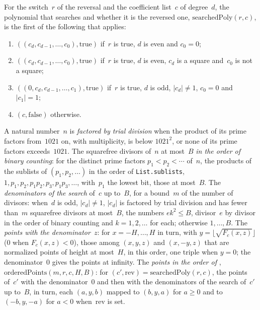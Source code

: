\begin{definition}\label{def:orderedPoints}
  \leanok
  For the switch~$r$ of the reversal and the coefficient list~$c$ of degree~$d$, the polynomial that
  \ratpoints{} searches and whether it is the reversed one, $\mathrm{searchedPoly}(r, c)$, is the first
  of the following that applies:
  \begin{enumerate}
    \item $((c_d, c_{d-1}, \dots, c_0), \mathrm{true})$ if~$r$ is true, $d$ is even and $c_0 = 0$;
    \item $((c_d, c_{d-1}, \dots, c_0), \mathrm{true})$ if~$r$ is true, $d$ is even, $c_d$ is a
      square and~$c_0$ is not a square;
    \item $((0, c_d, c_{d-1}, \dots, c_1), \mathrm{true})$ if~$r$ is true, $d$ is odd,
      $|c_d| \ne 1$, $c_0 = 0$ and $|c_1| = 1$;
    \item $(c, \mathrm{false})$ otherwise.
  \end{enumerate}
  A natural number~$n$ is \emph{factored by trial division} when the product of its prime factors
  from~$1021$ on, with multiplicity, is below $1021^2$, or none of its prime factors exceeds~$1021$.
  The squarefree divisors of~$n$ at most~$B$ \emph{in the order of binary counting}: for the
  distinct prime factors $p_1 < p_2 < \cdots$ of~$n$, the products of the sublists of
  $(p_1, p_2, \dots)$ in the order of \verb|List.sublists|,
  $1, p_1, p_2, p_1 p_2, p_3, p_1 p_3, \dots$, with~$p_1$ the lowest bit, those at most~$B$. The
  \emph{denominators of the search} of~$c$ up to~$B$, for a bound~$m$ of the number of divisors:
  when~$d$ is odd, $|c_d| \ne 1$, $|c_d|$ is factored by trial division and has fewer than~$m$
  squarefree divisors at most~$B$, the numbers $e k^2 \le B$, divisor~$e$ by divisor in the order of
  binary counting and $k = 1, 2, \dots$ for each; otherwise $1, \dots, B$. The \emph{points with the
  denominator}~$z$: for $x = -H, \dots, H$ in turn, with $y = \lfloor \sqrt{F_c(x, z)} \rfloor$ ($0$
  when $F_c(x, z) < 0$), those among $(x, y, z)$ and $(x, -y, z)$ that are normalized points of
  height at most~$H$, in this order, one triple when $y = 0$; the denominator~$0$ gives the points
  at infinity. The \emph{points in the order of \ratpoints{}}, $\mathrm{orderedPoints}(m, r, c, H, B)$:
  for $(c', \mathrm{rev}) = \mathrm{searchedPoly}(r, c)$, the points of~$c'$ with the
  denominator~$0$ and then with the denominators of the search of~$c'$ up to~$B$, in turn, each
  $(a, y, b)$ mapped to $(b, y, a)$ for $a \ge 0$ and to $(-b, y, -a)$ for $a < 0$
  when~$\mathrm{rev}$ is set.
\end{definition}

